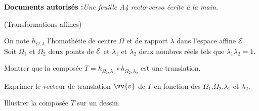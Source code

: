 \documentclass[a4paper,12pt,reqno]{amsart}
\begin{document}
\ifsolutions\else
\textbf{Documents autorisés :}\textit{Une feuille A4 recto-verso écrite à la main.}

\vspace{14mm}
\fi



\begin{exo} (Transformations affines)

  On note $h_{\Omega,\lambda}$ l'homothétie de centre $\Omega$ et de rapport $\lambda$ dans l'espace affine $\mathcal{E}$. Soit $\Omega_{1}$ et $\Omega_{2}$ deux points de $\mathcal{E}$ et $\lambda_{1}$ et $\lambda_{2}$ deux nombres réels tels que $\lambda_{1}\lambda_{2}=1$.

  \begin{questions}
    \item Montrer que la composée $T=h_{\Omega_{1},\lambda_{1}}\circ h_{\Omega_{2},\lambda_{2}}$ est une translation.
    \item Exprimer le vecteur de translation $\vv{v}$ de $T$ en fonction des $\Omega_{1}$,$\Omega_{2}$,$\lambda_{1}$ et $\lambda_{2}$.
    \item  Illustrer la composée $T$ sur un dessin.
  \end{questions}

\end{exo}
\end{document}

